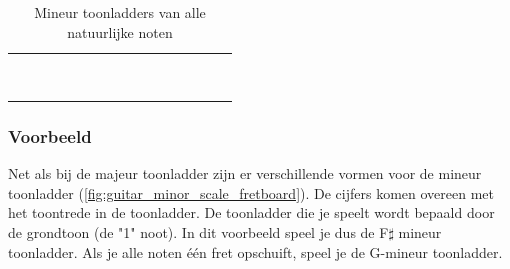\begin{table}[h]
	\centering
	\begin{NiceTabular}{*{16}{P{0.05mm}}}
		\Block{}{} &  & &  & &  & &  & &  & &  & &  & & \Block{}{} \\
		 & &  & &  & &  & &  & &  & &  & &  & \\
		 & &  & &  & &  & &  & &  & &  & &  & \\
		 & &  & &  & &  & &  & &  & &  & &  & \\
		 & &  & &  & &  & &  & &  & &  & &  & \\
		 & &  & &  & &  & &  & &  & &  & &  & \\
		 & &  & &  & &  & &  & &  & &  & &  & \\
		 & &  & &  & &  & &  & &  & &  & &  & \\
		 & &  & &  & &  & &  & &  & &  & &  & 
	\end{NiceTabular}
	\caption{Mineur toonladders van alle natuurlijke noten}
	\label{tab:guitar_natural_note_minor_scale}
\end{table}

\newpage

\subsubsection{Voorbeeld}

Net als bij de majeur toonladder zijn er verschillende vormen voor de mineur toonladder (\autoref{fig:guitar_minor_scale_fretboard}). De cijfers komen overeen met het toontrede in de toonladder. De toonladder die je speelt wordt bepaald door de grondtoon (de "1" noot). In dit voorbeeld speel je dus de F$\sharp$ mineur toonladder. Als je alle noten één fret opschuift, speel je de G-mineur toonladder.

